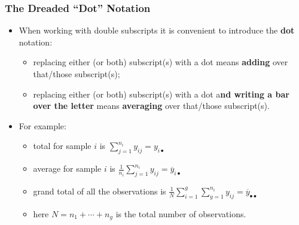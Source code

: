 \documentclass[a4paper]{article}\usepackage[]{graphicx}\usepackage[]{xcolor}
\begin{document}
\subsubsection{The Dreaded ``Dot'' Notation}
\begin{itemize}
	\item When working with double subscripts it is convenient to introduce the \textbf{dot} notation:
	\begin{itemize}
		\item replacing either (or both) subscript(s) with a dot means \textbf{adding} over that/those subscript(s);
		\item replacing either (or both) subscript(s) with a dot a\textbf{nd writing a bar over the letter} means \textbf{averaging} over that/those subscript(s).
	\end{itemize}
	\item For example:
	\begin{itemize}
		\item total for sample \( i \) is \( \sum_{j=1}^{n_i} y_{ij} = y_{i \bullet} \)
		\item average for sample \( i \) is \( \frac{1}{n_i} \sum_{j=1}^{n_i} y_{ij} = \overline{y}_{i \bullet} \) 
		\item grand total of all the observations is \( \frac{1}{N} \sum_{i=1}^{g} \sum_{y=1}^{n_i} y_{ij} = \overline{y}_{\bullet\bullet} \)
		\item here \( N = n_1 + \dotsb + n_g \) is the total number of observations. 
	\end{itemize}
\end{itemize}
\end{document}

